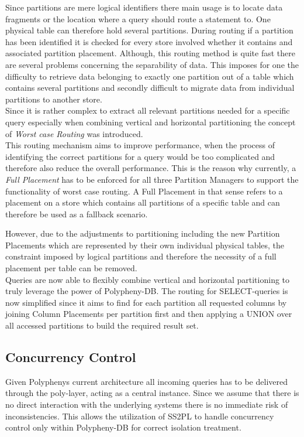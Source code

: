 Since partitions are mere logical identifiers there main usage is to locate data fragments or the location where a query should route a statement to.
One physical table can therefore hold several partitions.
During routing if a partition has been identified it is checked for every store involved whether it contains and associated partition placement.
Although, this routing method is quite fast there are several problems concerning the separability of data.
This imposes for one the difficulty to retrieve data belonging to exactly one partition out of a table which contains several partitions and secondly difficult 
to migrate data from individual partitions to another store.\\
Since it is rather complex to extract all relevant partitions needed for a specific query especially when combining vertical and horizontal partitioning
the concept of \textit{Worst case Routing} was introduced.\\
This routing mechanism aims to improve performance, when the process of identifying the correct partitions for a query would be too complicated and 
therefore also reduce the overall performance.   
This is the reason why currently, a \textit{Full Placement} has to be enforced for all three Partition Managers to support the functionality of worst case routing.
A Full Placement in that sense refers to a placement on a store which contains all partitions of a specific table and can therefore be used as a fallback scenario.

However, due to the adjustments to partitioning including the new Partition Placements which are represented by their own individual physical tables, the constraint imposed by logical 
partitions and therefore the necessity of a full placement per table can be removed.\\
Queries are  now able to flexibly combine vertical and horizontal partitioning to truly leverage the power of Polypheny-DB.
The routing for SELECT-queries is now simplified since it aims to find for each partition all requested columns by 
joining Column Placements per partition first and then applying a UNION over all accessed partitions to build the required result set.




\subsection{Concurrency Control}

Given Polyphenys current architecture all incoming queries has to be delivered through the poly-layer, acting as a central instance.
Since we assume that there is no direct interaction with the underlying systems there is no immediate risk of inconsistencies. 
This allows the utilization of SS2PL to handle concurrency control only within Polypheny-DB for correct isolation treatment.






